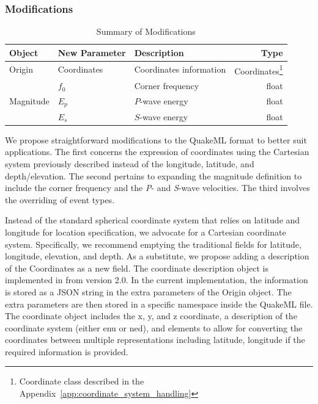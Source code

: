 \subsubsection{Modifications}

\begin{table}[!h]
\centering
\caption{Summary of Modifications}
\begin{tabular}{lllr}
\hline
\textbf{Object} & \textbf{New Parameter} & \textbf{Description} & \textbf{Type} \\
\hline
\multirow{1}{*}{Origin}     & Coordinates & Coordinates information & Coordinates\footnote{Coordinate class described in the Appendix~\ref{app:coordinate_system_handling}} \\
\hline
\multirow{3}{*}{Magnitude}  & \(f_0\) & Corner frequency & float \\
                            & \(E_p\) & \(P\)-wave energy & float \\
                            & \(E_s\) & \(S\)-wave energy & float \\
\hline
\end{tabular}
\end{table}

We propose straightforward modifications to the QuakeML format to better suit \museismic applications. The first concerns the expression of coordinates using the Cartesian system previously described instead of the longitude, latitude, and depth/elevation. The second pertains to expanding the magnitude definition to include the corner frequency and the \textit{P}- and \textit{S}-wave velocities. The third involves the overriding of event types.

Instead of the standard spherical coordinate system that relies on latitude and longitude for location specification, we advocate for a Cartesian coordinate system. Specifically, we recommend emptying the traditional fields for latitude, longitude, elevation, and depth. As a substitute, we propose adding a description of the Coordinates as a new field. The coordinate description object is implemented in \muquake from version 2.0. In the current implementation, the information is stored as a JSON string in the extra parameters of the Origin object. The extra parameters are then stored in a specific namespace inside the QuakeML file. The coordinate object includes the x, y, and z coordinate, a description of the coordinate system (either \gls{enu} or \gls{ned}), and elements to allow for converting the coordinates between multiple representations including latitude, longitude if the required information is provided.

